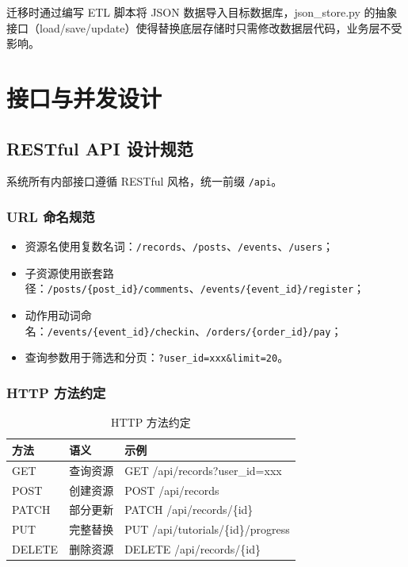 \documentclass[12pt,a4paper]{ctexart}
\begin{document}
迁移时通过编写 ETL 脚本将 JSON 数据导入目标数据库，json\_store.py 的抽象接口（load/save/update）使得替换底层存储时只需修改数据层代码，业务层不受影响。

\newpage

\section{接口与并发设计}

\subsection{RESTful API 设计规范}

系统所有内部接口遵循 RESTful 风格，统一前缀 \texttt{/api}。

\subsubsection{URL 命名规范}

\begin{itemize}
  \item 资源名使用复数名词：\texttt{/records}、\texttt{/posts}、\texttt{/events}、\texttt{/users}；
  \item 子资源使用嵌套路径：\texttt{/posts/\{post\_id\}/comments}、\texttt{/events/\{event\_id\}/register}；
  \item 动作用动词命名：\texttt{/events/\{event\_id\}/checkin}、\texttt{/orders/\{order\_id\}/pay}；
  \item 查询参数用于筛选和分页：\texttt{?user\_id=xxx\&limit=20}。
\end{itemize}

\subsubsection{HTTP 方法约定}

\begin{table}[H]
  \centering
  \caption{HTTP 方法约定}
  \label{tab:http-methods}
  \begin{tabular}{p{2cm}p{3cm}p{7cm}}
    \toprule
    \textbf{方法} & \textbf{语义} & \textbf{示例} \\
    \midrule
    GET & 查询资源 & GET /api/records?user\_id=xxx \\
    POST & 创建资源 & POST /api/records \\
    PATCH & 部分更新 & PATCH /api/records/\{id\} \\
    PUT & 完整替换 & PUT /api/tutorials/\{id\}/progress \\
    DELETE & 删除资源 & DELETE /api/records/\{id\} \\
    \bottomrule
  \end{tabular}
\end{table}
\end{document}
